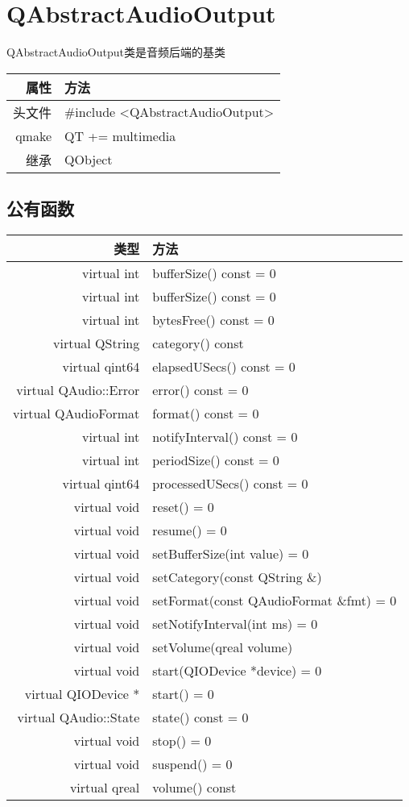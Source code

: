 \chapter{QAbstractAudioOutput}

QAbstractAudioOutput类是音频后端的基类


\begin{tabular}{|r|l|}
	\hline
	属性 & 方法 \\
	\hline
	头文件 & \#include <QAbstractAudioOutput>\\      
	\hline
	qmake &QT += multimedia\\      
	\hline
	继承&QObject \\
	\hline
\end{tabular}


\section{公有函数}

\begin{tabular}{|r|l|}
\hline
类型&方法\\
\hline
virtual int	&bufferSize() const = 0\\
\hline
virtual int	&bufferSize() const = 0\\
\hline
virtual int	&bytesFree() const = 0\\
\hline
virtual QString	&category() const\\
\hline
virtual qint64	&elapsedUSecs() const = 0\\
\hline
virtual QAudio::Error	&error() const = 0\\
\hline
virtual QAudioFormat	&format() const = 0\\
\hline
virtual int	& notifyInterval() const = 0\\
\hline
virtual int	& periodSize() const = 0\\
\hline
virtual qint64	&processedUSecs() const = 0\\
\hline
virtual void	&reset() = 0\\
\hline
virtual void	&resume() = 0\\
\hline
virtual void&	setBufferSize(int value) = 0\\
\hline
virtual void&	setCategory(const QString \&)\\
\hline
virtual void&	setFormat(const QAudioFormat \&fmt) = 0\\
\hline
virtual void&	setNotifyInterval(int ms) = 0\\
\hline
virtual void&	setVolume(qreal volume)\\
\hline
virtual void&	start(QIODevice *device) = 0\\
\hline
virtual QIODevice *	&start() = 0\\
\hline
virtual QAudio::State	&state() const = 0\\
\hline
virtual void	&stop() = 0\\
\hline
virtual void	&suspend() = 0 \\
\hline
virtual qreal	&volume() const\\
\hline
\end{tabular}

